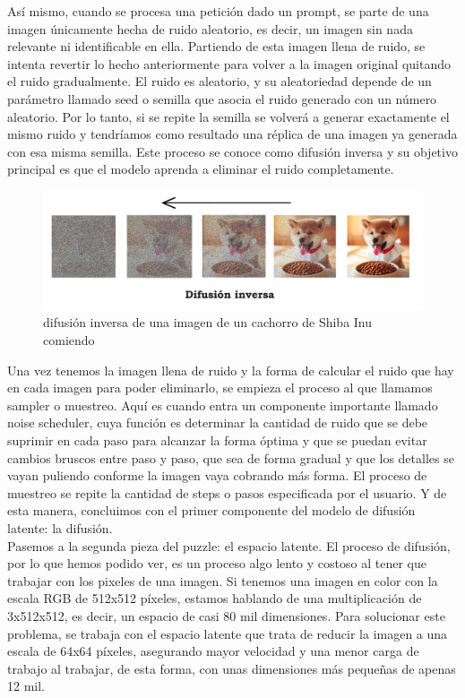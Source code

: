 Así mismo, cuando se procesa una petición dado un prompt, se parte de una imagen únicamente hecha de ruido aleatorio, es decir, un imagen sin nada relevante ni identificable en ella. Partiendo de esta imagen llena de ruido, se intenta revertir lo hecho anteriormente para volver a la imagen original quitando el ruido gradualmente. El ruido es aleatorio, y su aleatoriedad depende de un parámetro llamado seed o semilla que asocia el ruido generado con un número aleatorio. Por lo tanto, si se repite la semilla se volverá a generar exactamente el mismo ruido y tendríamos como resultado una réplica de una imagen ya generada con esa misma semilla. Este proceso se conoce como difusión inversa y su objetivo principal es que el modelo aprenda a eliminar el ruido completamente. \\

\begin{figure}[h]
	\centering
	\includegraphics[width = 1 \textwidth]{Imagenes/Vectorial/difusioninversa.png}
	\caption{difusión inversa de una imagen de un cachorro de Shiba Inu comiendo}
	\label{fig:difusioninversa}
\end{figure}

Una vez tenemos la imagen llena de ruido y la forma de calcular el ruido que hay en cada imagen para poder eliminarlo, se empieza el proceso al que llamamos sampler o muestreo. Aquí es cuando entra un componente importante llamado noise scheduler, cuya función es determinar la cantidad de ruido que se debe suprimir en cada paso para alcanzar la forma óptima y que se puedan evitar cambios bruscos entre paso y paso, que sea de forma gradual y que los detalles se vayan puliendo conforme la imagen vaya cobrando más forma. El proceso de muestreo se repite la cantidad de steps o pasos especificada por el usuario. Y de esta manera, concluimos con el primer componente del modelo de difusión latente: la difusión.\\ 

Pasemos a la segunda pieza del puzzle: el espacio latente. El proceso de difusión, por lo que hemos podido ver, es un proceso algo lento y costoso al tener que trabajar con los pixeles de una imagen. Si tenemos una imagen en color con la escala RGB de 512x512 píxeles, estamos hablando de una multiplicación de 3x512x512, es decir, un espacio de casi 80 mil dimensiones. Para solucionar este problema, se trabaja con el espacio latente que trata de reducir la imagen a una escala de 64x64 píxeles, asegurando mayor velocidad y una menor carga de trabajo al trabajar, de esta forma, con unas dimensiones más pequeñas de apenas 12 mil. 

